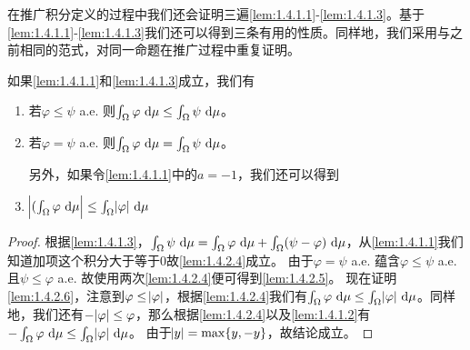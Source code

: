 \documentclass[../main.tex]{subfiles}
\begin{document}
在推广积分定义的过程中我们还会证明三遍\ref{lem:1.4.1.1}-\ref{lem:1.4.1.3}。基于\ref{lem:1.4.1.1}-\ref{lem:1.4.1.3}我们还可以得到三条有用的性质。同样地，我们采用与之前相同的范式，对同一命题在推广过程中重复证明。
\begin{lemma} \label{lem:1.4.2}
	如果\ref{lem:1.4.1.1}和\ref{lem:1.4.1.3}成立，我们有
	\begin{enumerate}[start=4]
		\item \label{lem:1.4.2.4} 若\(\varphi\leq\psi\) a.e. 则\(\int_\Omega\varphi\,\dif\mu\leq\int_\Omega\psi\,\dif\mu\)。
		\item \label{lem:1.4.2.5} 若\(\varphi=\psi\) a.e. 则\(\int_\Omega\varphi\,\dif\mu=\int_\Omega\psi\,\dif\mu\)。

		另外，如果令\ref{lem:1.4.1.1}中的\(a=-1\)，我们还可以得到
		\item \label{lem:1.4.2.6} \(\envert{(\int_\Omega\varphi\,\dif\mu}\leq\int_\Omega\envert{\varphi}\,\dif\mu\)
	\end{enumerate}
\end{lemma}
\begin{proof}
	根据\ref{lem:1.4.1.3}，\(\int_\Omega\psi\,\dif\mu=\int_\Omega\varphi\,\dif\mu+\int_\Omega(\psi-\varphi)\,\dif\mu\)，从\ref{lem:1.4.1.1}我们知道加项这个积分大于等于\(0\)故\ref{lem:1.4.2.4}成立。
	由于\(\varphi=\psi\) a.e. 蕴含\(\varphi\leq\psi\) a.e. 且\(\psi\leq\varphi\) a.e. 故使用两次\ref{lem:1.4.2.4}便可得到\ref{lem:1.4.2.5}。
	现在证明\ref{lem:1.4.2.6}，注意到\(\varphi\leq\envert{\varphi}\)，根据\ref{lem:1.4.2.4}我们有\(\int_\Omega\varphi\,\dif\mu\leq\int_\Omega\envert{\varphi}\,\dif\mu\)。同样地，我们还有\(-\envert{\varphi}\leq\varphi\)，那么根据\ref{lem:1.4.2.4}以及\ref{lem:1.4.1.2}有\(-\int_\Omega\varphi\,\dif\mu\leq\int_\Omega\envert{\varphi}\,\dif\mu\)。
	由于\(\envert{y}=\max\{y,-y\}\)，故结论成立。
\end{proof}
\end{document}

